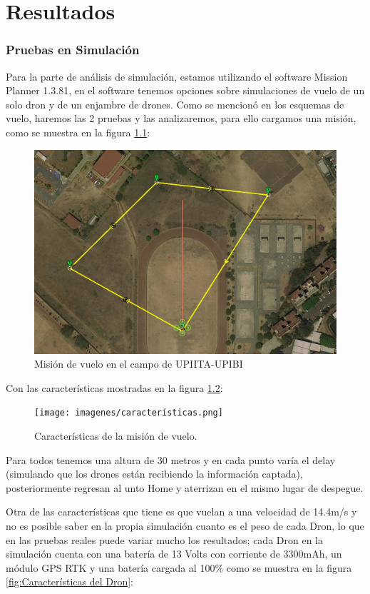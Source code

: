 \chapter{Resultados}
\subsection{Pruebas en Simulación}
Para la parte de análisis de simulación, estamos utilizando el software Mission Planner 1.3.81, en el software tenemos opciones sobre simulaciones de vuelo de un solo dron y de un enjambre de drones. Como se mencionó en los esquemas de vuelo, haremos las 2 pruebas y las analizaremos, para ello cargamos una misión, como se muestra en la figura \ref{fig:mision-vuelo}:

\begin{figure}[h]
    \centering
    \includegraphics[width=0.7\linewidth]{imagenes/prueba_vuelo.png}
    \caption{Misión de vuelo en el campo de UPIITA-UPIBI}
    \label{fig:mision-vuelo}
\end{figure}
\newpage
Con las características mostradas en la figura \ref{fig:Características-vuelo}:
\begin{figure}[h]
    \centering
    \texttt{[image: imagenes/características.png]}
    \caption{Características de la misión de vuelo.}
    \label{fig:Características-vuelo}
\end{figure}
\newpage
Para todos tenemos una altura de 30 metros y en cada punto varía el \textquotedbl{}delay\textquotedbl{} (simulando que los drones están recibiendo la información captada), posteriormente regresan al unto \textquotedbl{}Home\textquotedbl{} y aterrizan en el mismo lugar de despegue.

Otra de las características que tiene es que vuelan a una velocidad de 14.4m/s y no es posible saber en la propia simulación cuanto es el peso de cada Dron, lo que en las pruebas reales puede variar mucho los resultados; cada Dron en la simulación cuenta con una batería de 13 Volts con corriente de 3300mAh, un módulo GPS RTK y una batería cargada al 100\% como se muestra en la figura \ref{fig:Características del Dron}:

